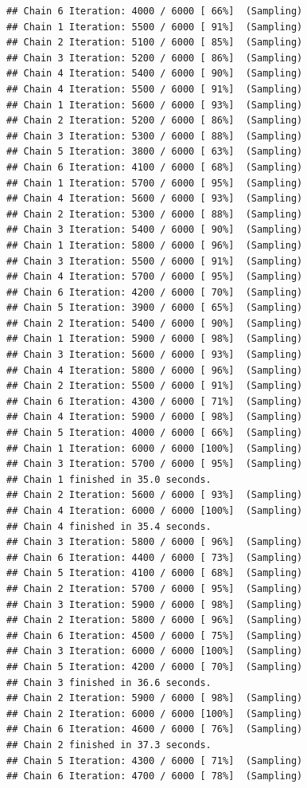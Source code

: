 \documentclass[
]{article}
\begin{document}
\begin{verbatim}
## Chain 6 Iteration: 4000 / 6000 [ 66%]  (Sampling) 
## Chain 1 Iteration: 5500 / 6000 [ 91%]  (Sampling) 
## Chain 2 Iteration: 5100 / 6000 [ 85%]  (Sampling) 
## Chain 3 Iteration: 5200 / 6000 [ 86%]  (Sampling) 
## Chain 4 Iteration: 5400 / 6000 [ 90%]  (Sampling) 
## Chain 4 Iteration: 5500 / 6000 [ 91%]  (Sampling) 
## Chain 1 Iteration: 5600 / 6000 [ 93%]  (Sampling) 
## Chain 2 Iteration: 5200 / 6000 [ 86%]  (Sampling) 
## Chain 3 Iteration: 5300 / 6000 [ 88%]  (Sampling) 
## Chain 5 Iteration: 3800 / 6000 [ 63%]  (Sampling) 
## Chain 6 Iteration: 4100 / 6000 [ 68%]  (Sampling) 
## Chain 1 Iteration: 5700 / 6000 [ 95%]  (Sampling) 
## Chain 4 Iteration: 5600 / 6000 [ 93%]  (Sampling) 
## Chain 2 Iteration: 5300 / 6000 [ 88%]  (Sampling) 
## Chain 3 Iteration: 5400 / 6000 [ 90%]  (Sampling) 
## Chain 1 Iteration: 5800 / 6000 [ 96%]  (Sampling) 
## Chain 3 Iteration: 5500 / 6000 [ 91%]  (Sampling) 
## Chain 4 Iteration: 5700 / 6000 [ 95%]  (Sampling) 
## Chain 6 Iteration: 4200 / 6000 [ 70%]  (Sampling) 
## Chain 5 Iteration: 3900 / 6000 [ 65%]  (Sampling) 
## Chain 2 Iteration: 5400 / 6000 [ 90%]  (Sampling) 
## Chain 1 Iteration: 5900 / 6000 [ 98%]  (Sampling) 
## Chain 3 Iteration: 5600 / 6000 [ 93%]  (Sampling) 
## Chain 4 Iteration: 5800 / 6000 [ 96%]  (Sampling) 
## Chain 2 Iteration: 5500 / 6000 [ 91%]  (Sampling) 
## Chain 6 Iteration: 4300 / 6000 [ 71%]  (Sampling) 
## Chain 4 Iteration: 5900 / 6000 [ 98%]  (Sampling) 
## Chain 5 Iteration: 4000 / 6000 [ 66%]  (Sampling) 
## Chain 1 Iteration: 6000 / 6000 [100%]  (Sampling) 
## Chain 3 Iteration: 5700 / 6000 [ 95%]  (Sampling) 
## Chain 1 finished in 35.0 seconds.
## Chain 2 Iteration: 5600 / 6000 [ 93%]  (Sampling) 
## Chain 4 Iteration: 6000 / 6000 [100%]  (Sampling) 
## Chain 4 finished in 35.4 seconds.
## Chain 3 Iteration: 5800 / 6000 [ 96%]  (Sampling) 
## Chain 6 Iteration: 4400 / 6000 [ 73%]  (Sampling) 
## Chain 5 Iteration: 4100 / 6000 [ 68%]  (Sampling) 
## Chain 2 Iteration: 5700 / 6000 [ 95%]  (Sampling) 
## Chain 3 Iteration: 5900 / 6000 [ 98%]  (Sampling) 
## Chain 2 Iteration: 5800 / 6000 [ 96%]  (Sampling) 
## Chain 6 Iteration: 4500 / 6000 [ 75%]  (Sampling) 
## Chain 3 Iteration: 6000 / 6000 [100%]  (Sampling) 
## Chain 5 Iteration: 4200 / 6000 [ 70%]  (Sampling) 
## Chain 3 finished in 36.6 seconds.
## Chain 2 Iteration: 5900 / 6000 [ 98%]  (Sampling) 
## Chain 2 Iteration: 6000 / 6000 [100%]  (Sampling) 
## Chain 6 Iteration: 4600 / 6000 [ 76%]  (Sampling) 
## Chain 2 finished in 37.3 seconds.
## Chain 5 Iteration: 4300 / 6000 [ 71%]  (Sampling) 
## Chain 6 Iteration: 4700 / 6000 [ 78%]  (Sampling) 

\end{verbatim}
\end{document}
